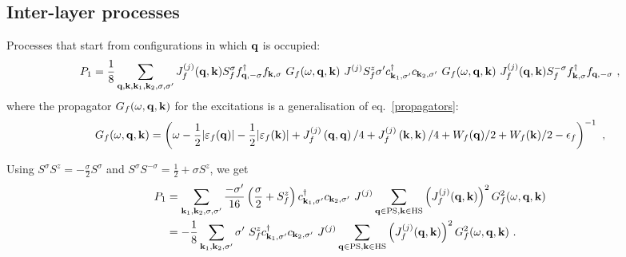 \documentclass[%
reprint,
superscriptaddress,
groupedaddress,
superscriptaddress,
onecolumn,
10pt
]{revtex4-2}
\begin{document}
\subsection{Inter-layer processes}
Processes that start from configurations in which \({\bf q}\) is occupied:
\begin{equation}\begin{aligned}
	P_1 = \frac{1}{8}\sum_{{\bf q},{\bf k},{\bf k}_1, {\bf k}_2,\sigma,\sigma^\prime} J_f^{(j)}({\bf q},{\bf k}) S_f^\sigma f^\dagger_{{\bf q},-\sigma}f_{{\bf k},\sigma} ~ G_f(\omega, {\bf q}, {\bf k}) ~ J^{(j)} S_f^z \sigma^\prime c^\dagger_{{\bf k}_1,\sigma^\prime}c_{{\bf k}_2,\sigma^\prime} ~ G_f(\omega, {\bf q}, {\bf k}) ~ J_f^{(j)}({\bf q},{\bf k}) S_f^{-\sigma} f^\dagger_{{\bf k},\sigma}f_{{\bf q},-\sigma}~,
\end{aligned}\end{equation}
where the propagator \(G_f(\omega, {\bf q}, {\bf k})\) for the excitations is a generalisation of eq.~\ref{propagators}:
\begin{equation}\begin{aligned}
	G_f(\omega, {\bf q}, {\bf k}) &= \left(\omega - \frac{1}{2}|\varepsilon_f({\bf q})| - \frac{1}{2}|\varepsilon_f({\bf k})| + J^{(j)}_f\left({\bf q},{\bf q}\right)/4 + J^{(j)}_f\left({\bf k},{\bf k}\right)/4 + W_f({\bf q})/2 + W_f({\bf k})/2 - \epsilon_f\right)^{-1} ~,\\
\end{aligned}\end{equation}

Using \(S^\sigma S^z = -\frac{\sigma}{2}S^\sigma\) and \(S^\sigma S^{-\sigma} = \frac{1}{2} + \sigma S^z\), we get
\begin{equation}\begin{aligned}
	P_1 &= \sum_{{\bf k}_1, {\bf k}_2,\sigma,\sigma^\prime} \frac{-\sigma^\prime}{16} \left(\frac{\sigma}{2} + S_f^z\right) c^\dagger_{{\bf k}_1,\sigma^\prime}c_{{\bf k}_2,\sigma^\prime} ~  J^{(j)} \sum_{{\bf q} \in \text{PS} ,{\bf k} \in \text{HS}}\left(J_f^{(j)}({\bf q},{\bf k})\right)^2 G^2_f(\omega, {\bf q}, {\bf k})\\
		&= -\frac{1}{8}\sum_{{\bf k}_1, {\bf k}_2,\sigma^\prime} \sigma^\prime~S_f^z c^\dagger_{{\bf k}_1,\sigma^\prime}c_{{\bf k}_2,\sigma^\prime} ~  J^{(j)} \sum_{{\bf q} \in \text{PS} ,{\bf k} \in \text{HS}}\left(J_f^{(j)}({\bf q},{\bf k})\right)^2 G^2_f(\omega, {\bf q}, {\bf k})~.
\end{aligned}\end{equation}
\end{document}
